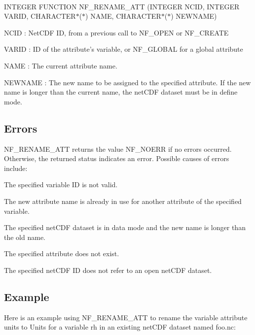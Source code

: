 

I\+N\+T\+E\+G\+ER F\+U\+N\+C\+T\+I\+ON N\+F\+\_\+\+R\+E\+N\+A\+M\+E\+\_\+\+A\+TT (I\+N\+T\+E\+G\+ER N\+C\+ID, I\+N\+T\+E\+G\+ER V\+A\+R\+ID, C\+H\+A\+R\+A\+C\+T\+E\+R$\ast$($\ast$) N\+A\+ME, C\+H\+A\+R\+A\+C\+T\+E\+R$\ast$($\ast$) N\+E\+W\+N\+A\+ME)

{\ttfamily N\+C\+ID} \+: Net\+C\+DF ID, from a previous call to N\+F\+\_\+\+O\+P\+EN or N\+F\+\_\+\+C\+R\+E\+A\+TE

{\ttfamily V\+A\+R\+ID} \+: ID of the attribute’s variable, or N\+F\+\_\+\+G\+L\+O\+B\+AL for a global attribute

{\ttfamily N\+A\+ME} \+: The current attribute name.

{\ttfamily N\+E\+W\+N\+A\+ME} \+: The new name to be assigned to the specified attribute. If the new name is longer than the current name, the net\+C\+DF dataset must be in define mode.

\subsection*{Errors }

N\+F\+\_\+\+R\+E\+N\+A\+M\+E\+\_\+\+A\+TT returns the value N\+F\+\_\+\+N\+O\+E\+RR if no errors occurred. Otherwise, the returned status indicates an error. Possible causes of errors include\+:


\begin{DoxyItemize}
\item The specified variable ID is not valid.
\item The new attribute name is already in use for another attribute of the specified variable.
\item The specified net\+C\+DF dataset is in data mode and the new name is longer than the old name.
\item The specified attribute does not exist.
\item The specified net\+C\+DF ID does not refer to an open net\+C\+DF dataset.
\end{DoxyItemize}

\subsection*{Example }

Here is an example using N\+F\+\_\+\+R\+E\+N\+A\+M\+E\+\_\+\+A\+TT to rename the variable attribute units to Units for a variable rh in an existing net\+C\+DF dataset named foo.\+nc\+:

